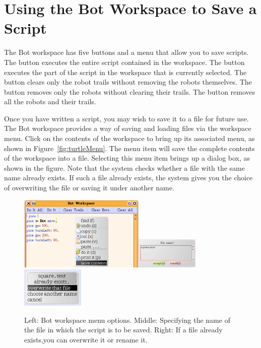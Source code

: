 \documentclass[a4paper,10pt,twoside]{book}
\begin{document}
\section{Using the Bot Workspace to Save a Script}

The Bot workspace has five buttons and a menu that allow you to save scripts. The button 
 executes the entire script contained in the workspace. The button  executes 
the part of the script in the workspace that is currently selected. The button 
clears only the robot trails without removing the robots themselves. The button 
removes only the robots without clearing their trails. The button  removes all the 
robots and their trails. 

Once you have written a script, you may wish to save it to a file for future use. The Bot 
workspace provides a way of saving and loading files via the workspace menu. Click on the 
contents of the workspace to bring up its associated menu, as shown in Figure~\ref{fig:turtleMenu}. The menu 
item  will save the complete contents of the workspace into a file. Selecting this 
menu item brings up a dialog box, as shown in the figure. Note that the system checks whether 
a file with the same name already exists. If such a file already exists, the system gives you the 
choice of overwriting the file or saving it under another name. 

\begin{figure}[h]
\includegraphics[width=6cm]{saveContents}\includegraphics[width=3cm]{enteringFileName}\includegraphics[width=3cm]{overwrite}
\caption{Left: Bot workspace menu options. Middle: Specifying the name of the file in which the script is to be saved. Right: If a file already exists,you can overwrite it or rename it.\label{fig:turtleMenu} \label{fig:enteringFileName}}
\end{figure}
\end{document}
